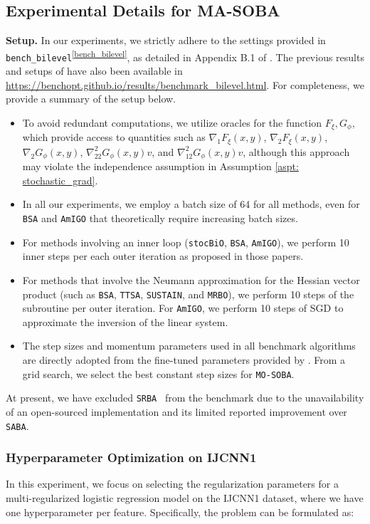 \documentclass[10pt]{article}
\newcommand{\sref}[1]{\textsuperscript{\ref{#1}}}
\theoremstyle{remark}
\begin{document}
\subsection{Experimental Details for MA-SOBA}

\textbf{Setup.} In our experiments, we strictly adhere to the settings provided in \texttt{bench\_bilevel}\sref{bench_bilevel}, as detailed in Appendix B.1 of \cite{dagreou2022framework}. The previous results and setups of \cite{dagreou2022framework} have also been available in \url{https://benchopt.github.io/results/benchmark_bilevel.html}. For completeness, we provide a summary of the setup below.
\begin{itemize}[leftmargin=1.5em]
    \item To avoid redundant computations, we utilize oracles for the function $F_\xi, G_\phi$, which provide access to quantities such as $\nabla_1 F_\xi(x,y)$, $\nabla_2 F_\xi(x, y)$, $\nabla_2 G_\phi(x,y)$, $\nabla_{22}^{2} G_\phi(x,y)v$, and $\nabla_{12}^{2} G_\phi(x,y)v$, although this approach may violate the independence assumption in Assumption \ref{aspt: stochastic_grad}.
    \item In all our experiments, we employ a batch size of 64 for all methods, even for \texttt{BSA} and \texttt{AmIGO} that theoretically require increasing batch sizes.
    \item For methods involving an inner loop (\texttt{stocBiO}, \texttt{BSA}, \texttt{AmIGO}), we perform 10 inner steps per each outer iteration as proposed in those papers. 
    \item For methods that involve the Neumann approximation for the Hessian vector product (such as \texttt{BSA}, \texttt{TTSA}, \texttt{SUSTAIN}, and \texttt{MRBO}), we perform 10 steps of the subroutine per outer iteration. For \texttt{AmIGO}, we perform 10 steps of SGD to approximate the inversion of the linear system.
    \item The step sizes and momentum parameters used in all benchmark algorithms are directly adopted from the fine-tuned parameters provided by \cite{dagreou2022framework}. From a grid search, we select the best constant step sizes for \texttt{MO-SOBA}.
\end{itemize}

At present, we have excluded \texttt{SRBA}~\cite{dagreou2023lower} from the benchmark due to the unavailability of an open-sourced implementation and its limited reported improvement over \texttt{SABA}.

\subsubsection{Hyperparameter Optimization on IJCNN1}
In this experiment, we focus on selecting the regularization parameters for a multi-regularized logistic regression model on the IJCNN1 dataset, where we have one hyperparameter per feature. Specifically, the problem can be formulated as:
\end{document}
